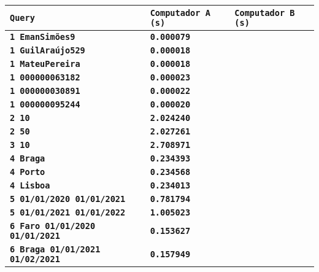 \documentclass[12pt,a4paper]{report}
\begin{document}
{
\setlength\arrayrulewidth{1pt}
\begin{tabularx}{\textwidth} { 
  | >{\centering\arraybackslash}X
  | >{\centering\arraybackslash}X
  | >{\centering\arraybackslash}X | }
 \hline
 \texttt{\textbf{Query}} & \texttt{\textbf{Computador A (s)}} & \texttt{\textbf{Computador B (s)}} \\
 \hline
 \texttt{\textbf{1 EmanSimões9}} & \texttt{\textbf{0.000079}} & \texttt{\textbf{}} \\
 \hline
 \texttt{\textbf{1 GuilAraújo529}} & \texttt{\textbf{0.000018}} & \texttt{\textbf{}} \\
 \hline
 \texttt{\textbf{1 MateuPereira}} & \texttt{\textbf{0.000018}} & \texttt{\textbf{}} \\
 \hline
 \texttt{\textbf{1 000000063182}} & \texttt{\textbf{0.000023}} & \texttt{\textbf{}} \\
 \hline
 \texttt{\textbf{1 000000030891}} & \texttt{\textbf{0.000022}} & \texttt{\textbf{}} \\
 \hline
 \texttt{\textbf{1 000000095244}} & \texttt{\textbf{0.000020}} & \texttt{\textbf{}} \\
 \hline
 \texttt{\textbf{2 10}} & \texttt{\textbf{2.024240}} & \texttt{\textbf{}} \\
 \hline
 \texttt{\textbf{2 50}} & \texttt{\textbf{2.027261}} & \texttt{\textbf{}} \\
 \hline
 \texttt{\textbf{3 10}} & \texttt{\textbf{2.708971}} & \texttt{\textbf{}} \\
 \hline
 \texttt{\textbf{4 Braga}} & \texttt{\textbf{0.234393}} & \texttt{\textbf{}} \\
 \hline
 \texttt{\textbf{4 Porto}} & \texttt{\textbf{0.234568}} & \texttt{\textbf{}} \\
 \hline
 \texttt{\textbf{4 Lisboa}} & \texttt{\textbf{0.234013}} & \texttt{\textbf{}} \\
 \hline
 \texttt{\textbf{5 01/01/2020 01/01/2021}} & \vspace{-5pt}\texttt{\textbf{0.781794}} & \texttt{\textbf{}} \\
 \hline
 \texttt{\textbf{5 01/01/2021 01/01/2022}} & \vspace{-5pt}\texttt{\textbf{1.005023}} & \texttt{\textbf{}} \\
 \hline
 \texttt{\textbf{6 Faro 01/01/2020 01/01/2021}} & \vspace{-5pt}\texttt{\textbf{0.153627}} & \texttt{\textbf{}} \\
 \hline
 \texttt{\textbf{6 Braga 01/01/2021 01/02/2021}} & \vspace{-5pt}\texttt{\textbf{0.157949}} & \texttt{\textbf{}} \\

\end{tabularx}}
\end{document}
